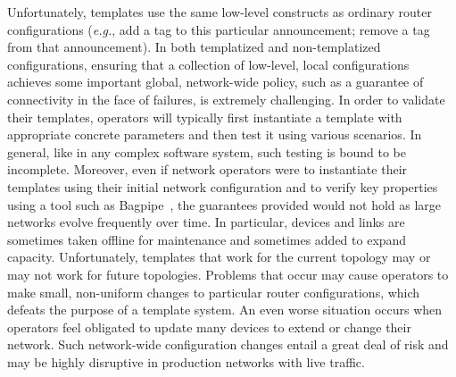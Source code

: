 \documentclass[numbers, 10pt, preprint]{sigplanconf}
\newcommand{\EG}{\emph{e.g.}}
\begin{document}
Unfortunately, templates use the same low-level constructs as ordinary router configurations (\EG,
add a tag to this particular announcement; remove a tag from that announcement).  In both templatized
and non-templatized configurations, ensuring that a collection of low-level, local configurations
achieves some important global, network-wide policy, such as a guarantee of connectivity in the face of 
failures, is extremely challenging.
%
%
In order to validate their templates, operators will typically first instantiate a template with appropriate
concrete parameters
and then test it using various scenarios.  In general, like in any complex software system, such testing is 
bound to be incomplete.
Moreover, even if network operators were to instantiate their templates using their initial network 
configuration and to verify key properties using a tool such as Bagpipe~\cite{bagpipe}, the guarantees
provided would not hold as large networks evolve frequently over time.  In particular,
devices and links are sometimes taken offline for maintenance and sometimes added to expand
capacity.  Unfortunately, templates that
work for the current topology may or may not work for future
topologies. Problems that occur may cause operators to make small, non-uniform changes to particular router configurations,
which defeats the purpose of a template system.  An even worse situation occurs when
operators feel obligated to update many devices to extend or change their network.  
Such network-wide configuration changes entail a great deal of risk and may be highly
disruptive in production networks with live traffic.
\end{document}
